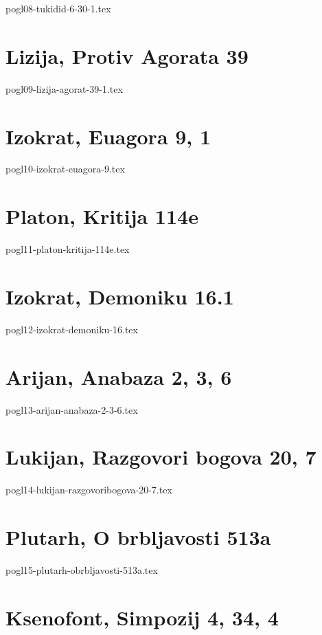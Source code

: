 \documentclass[a4paper,12pt,twoside]{report}
\begin{document}
{pogl08-tukidid-6-30-1.tex}

\chapter{Lizija, Protiv Agorata 39}

{pogl09-lizija-agorat-39-1.tex}

\chapter{Izokrat, Euagora 9, 1}

{pogl10-izokrat-euagora-9.tex}

\clearpage
\thispagestyle{empty}

\chapter{Platon, Kritija 114e}

{pogl11-platon-kritija-114e.tex}

\chapter{Izokrat, Demoniku 16.1}

{pogl12-izokrat-demoniku-16.tex}

\chapter{Arijan, Anabaza 2, 3, 6}

{pogl13-arijan-anabaza-2-3-6.tex}

\chapter{Lukijan, Razgovori bogova 20, 7}

{pogl14-lukijan-razgovoribogova-20-7.tex}

\chapter{Plutarh, O brbljavosti 513a}

{pogl15-plutarh-obrbljavosti-513a.tex}

\chapter{Ksenofont, Simpozij 4, 34, 4}
\end{document}
